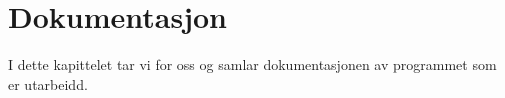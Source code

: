 \chapter{Dokumentasjon}
\thispagestyle{fancy}

I dette kapittelet tar vi for oss og samlar dokumentasjonen av programmet som er utarbeidd.